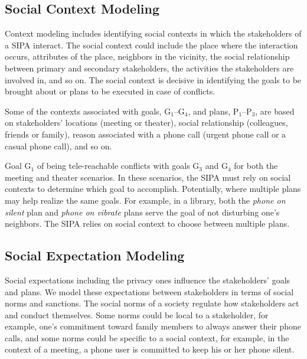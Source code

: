 \documentclass[11pt,          %
               phd,           %
               onehalfspacing %
               ]{ncsuthesis}
\newcommand{\fsl}{\textsl}
\begin{document}
\subsection{Social Context Modeling}

Context modeling includes identifying social contexts in which the
stakeholders of a SIPA interact. The social context could include the
place where the interaction occurs, attributes of the place, neighbors
in the vicinity, the social relationship between primary and secondary
stakeholders, the activities the stakeholders are involved in, and so
on. The social context is decisive in identifying the goals to be
brought about or plans to be executed in case of conflicts.

Some of the contexts associated with goals, G$_1$--G$_4$, and plans,
P$_1$--P$_3$, are based on stakeholders' locations (meeting or theater),
social relationship (colleagues, friends or family), reason
associated with a phone call (urgent phone call or a casual phone
call), and so on.

Goal G$_1$ of being tele-reachable conflicts with goals
G$_3$ and G$_4$ for both the meeting and theater scenarios.
In these scenarios, the SIPA must rely on social
contexts to determine which goal to accomplish. Potentially,
where multiple plans may help realize the same goals. For example, in a
library, both the \fsl{phone on silent} plan and \fsl{phone on vibrate}
plans serve the goal of not disturbing one's neighbors. The SIPA
relies on social context to choose between multiple plans. 
  
\subsection{Social Expectation Modeling}

Social expectations including the privacy ones influence the
stakeholders' goals and plans. We model these expectations between
stakeholders in terms of social norms and sanctions. The social norms of
a society regulate how stakeholders act and conduct themselves. Some
norms could be local to a stakeholder, for example, one's commitment
toward family members to always answer their phone calls, and some norms
could be specific to a social context, for example, in the context of a
meeting, a phone user is committed to keep his or her phone silent.
\end{document}
